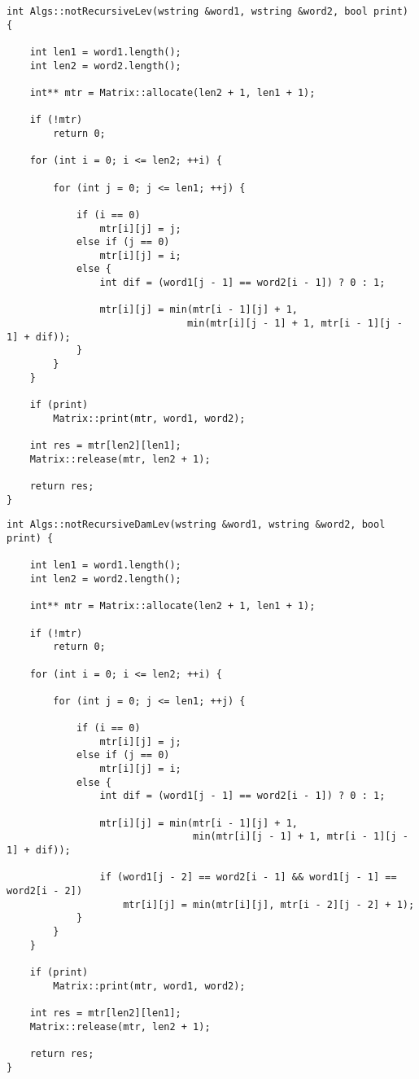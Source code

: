 \begin{lstlisting}[label=lst:lev_mtr,caption=Функция нахождения расстояния Левенштейна с использованием матрицы (начало)]
int Algs::notRecursiveLev(wstring &word1, wstring &word2, bool print) {
    
    int len1 = word1.length();
    int len2 = word2.length();

    int** mtr = Matrix::allocate(len2 + 1, len1 + 1);

    if (!mtr)
        return 0;

    for (int i = 0; i <= len2; ++i) {

        for (int j = 0; j <= len1; ++j) {

            if (i == 0)
                mtr[i][j] = j;
            else if (j == 0)
                mtr[i][j] = i;
            else {
                int dif = (word1[j - 1] == word2[i - 1]) ? 0 : 1;

                mtr[i][j] = min(mtr[i - 1][j] + 1, 
                               min(mtr[i][j - 1] + 1, mtr[i - 1][j - 1] + dif));
            }
        }
    }

    if (print)  
        Matrix::print(mtr, word1, word2);

    int res = mtr[len2][len1];
    Matrix::release(mtr, len2 + 1);

    return res;
}
\end{lstlisting}

\begin{lstlisting}[label=lst:dameray_lev_rec,caption=Функция нахождения расстояния Дамерау\,--\,Левенштейна с использованием матрицы (начало)]
int Algs::notRecursiveDamLev(wstring &word1, wstring &word2, bool print) {

    int len1 = word1.length();
    int len2 = word2.length();

    int** mtr = Matrix::allocate(len2 + 1, len1 + 1);

    if (!mtr)
        return 0;

    for (int i = 0; i <= len2; ++i) {

        for (int j = 0; j <= len1; ++j) {

            if (i == 0)
                mtr[i][j] = j;
            else if (j == 0)
                mtr[i][j] = i;
            else {
                int dif = (word1[j - 1] == word2[i - 1]) ? 0 : 1;

                mtr[i][j] = min(mtr[i - 1][j] + 1, 
                                min(mtr[i][j - 1] + 1, mtr[i - 1][j - 1] + dif));

                if (word1[j - 2] == word2[i - 1] && word1[j - 1] == word2[i - 2]) 
                    mtr[i][j] = min(mtr[i][j], mtr[i - 2][j - 2] + 1);
            }
        }
    }

    if (print)  
        Matrix::print(mtr, word1, word2);

    int res = mtr[len2][len1];
    Matrix::release(mtr, len2 + 1);

    return res;
}
\end{lstlisting}

